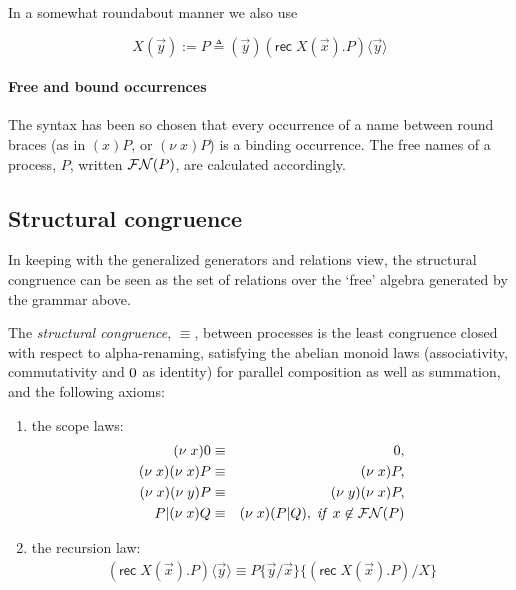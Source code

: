 \documentclass[]{llncs}
\begin{document}
In a somewhat roundabout manner we also use 

\begin{equation}
  X(\vec{y}) := P \triangleq (\vec{y})(\textsf{rec} \; X(\vec{x}).P)\langle \vec{y} \rangle
\end{equation}

\paragraph{Free and bound occurrences}

The syntax has been so chosen that every occurrence of a name between
round braces (as in $(x)P$, or $(\nu \; x)P$) is a binding
occurrence. The free names of a process, $P$, written $\mathbin{\mathcal{FN}(P)}$, are
calculated accordingly.

\subsection{Structural congruence}

In keeping with the generalized generators and relations view, the
structural congruence can be seen as the set of relations over the
`free' algebra generated by the grammar above.

\begin{definition}
  The {\em structural congruence}, $\equiv$, between processes is the
  least congruence closed with respect to alpha-renaming, satisfying
  the abelian monoid laws (associativity, commutativity and $\mathbin{0}$
  as identity) for parallel composition as well as summation, and the
  following axioms:
\begin{enumerate}
\item the scope laws:
\begin{eqnarray}
 (\nu \; x)\mathbin{0}  & \equiv & \mathbin{0}, \nonumber\\
 (\nu \; x)(\nu \; x)P & \equiv & (\nu \; x)P, \nonumber\\
 (\nu \; x)(\nu \; y)P & \equiv & (\nu \; y)(\nu \; x)P, \nonumber\\
 P | (\nu \; x)Q & \equiv & (\nu \; x)(P|Q), \; \mbox{\textit{if} }x \not\in \mathbin{\mathcal{FN}(P)} \nonumber
\end{eqnarray}
\item
the recursion law:
\begin{eqnarray}
  (\textsf{rec} \; X(\vec{x}).P)\langle \vec{y} \rangle \equiv P\{\vec{y}/\vec{x}\}\{(\textsf{rec} \; X(\vec{x}).P)/X\} \nonumber
\end{eqnarray}
\end{enumerate}
\end{definition}
\end{document}
